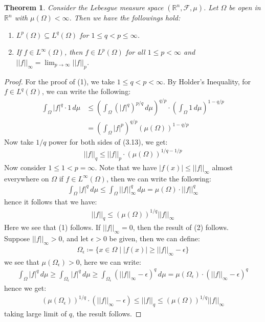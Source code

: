 \documentclass[11pt]{book}
\theoremstyle{break}
\theoremstyle{break}
\newtheorem{thm}{Theorem}[section]
\newcommand{\R}{\mathbb{R}}
\begin{document}
\begin{thm}
Consider the Lebesgue measure space $(\R^n, \mathcal{F}, \mu)$. Let $\Omega$ be open in $\R^n$ with $\mu(\Omega) < \infty$. Then we have the followings hold:
\begin{enumerate}[topsep=3pt,itemsep=-1ex,partopsep=1ex,parsep=1ex]
\item $L^p(\Omega) \subseteq L^q(\Omega)$ for $1 \leq q < p \leq \infty$.
\item If $f \in L^{\infty}(\Omega)$, then $f \in L^p(\Omega)$ for all $1 \leq p < \infty$ and $||f||_{\infty} = \lim_{p\to \infty}||f||_p$. 
\end{enumerate}
\end{thm}
\begin{proof}
For the proof of (1), we take $1 \leq q< p < \infty$. By Holder's Inequality, for $f \in L^q(\Omega)$, we can write the following:
\begin{align*}
\int_\Omega |f|^q \cdot 1 \, d\mu &\leq \left(\int_{\Omega} \left(|f|^q\right)^{p/q}\, d\mu\right)^{q/p} \cdot \left(\int_{\Omega}1 \, d\mu\right)^{1-q/p}\\
&= \left( \int_{\Omega} |f|^p \right)^{q/p} \left( \mu(\Omega) \right)^{1-q/p} \tag{3.13}
\end{align*}
Now take $1/q$ power for both sides of (3.13), we get:
\begin{align*}
||f||_q \leq ||f||_p \cdot (\mu(\Omega))^{1/q - 1/p}
\end{align*}
Now consider $1 \leq 1 < p = \infty$. Note that we have $|f(x) | \leq ||f||_{\infty}$ almost everywhere on $\Omega$ if $f \in L^{\infty}(\Omega)$, then we can write the following:
\begin{align*}
\int_{\Omega}|f|^q \, d\mu \leq \int_{\Omega} ||f||_{\infty}^q \, d\mu = \mu(\Omega) \cdot ||f||_{\infty}^q
\end{align*}
hence it follows that we have:
\begin{align*}
||f||_q \leq \left( \mu(\Omega)\right)^{1/q} ||f||_{\infty}
\end{align*}
Here we see that (1) follows. If $||f||_{\infty} = 0$, then the result of (2) follows. \\
Suppose $||f||_{\infty} > 0$, and let $\epsilon>0$ be given, then we can define:
\begin{align*}
\Omega_{\epsilon} \coloneqq \{ x \in \Omega \mid |f(x) | \geq ||f||_{\infty} - \epsilon\}
\end{align*}
we see that $\mu(\Omega_\epsilon) >0$, here we can write:
\begin{align*}
\int_{\Omega}|f|^q\, d\mu \geq \int_{\Omega_\epsilon} |f|^q\,d\mu \geq \int_{\Omega_\epsilon} (||f||_{\infty} - \epsilon)^q \,d\mu= \mu(\Omega_\epsilon) \cdot \left( ||f||_{\infty} -\epsilon\right)^q
\end{align*}
hence we get:
\begin{align*}
\left( \mu(\Omega_\epsilon) \right)^{1/q} \cdot \left( ||f||_{\infty} - \epsilon\right) \leq ||f||_q \leq \left( \mu(\Omega) \right)^{1/q} || f||_{\infty}
\end{align*}
taking large limit of $q$, the result follows. 
\end{proof}
\end{document}
